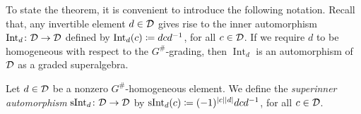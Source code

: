 
To state the theorem, it is convenient to introduce the following notation. 
Recall that, any invertible element $d\in \mathcal{D}$ gives rise to the inner automorphism $\operatorname{Int}_d\colon \mathcal{D} \to \mathcal{D}$ defined by $\operatorname{Int}_d (c) \coloneqq dcd^{-1}$, for all $c\in \mathcal{D}$. 
If we require $d$ to be homogeneous with respect to the $G^\#$-grading, then $\operatorname{Int}_d$ is an automorphism of $\mathcal{D}$ as a graded superalgebra.

\begin{defi}
    Let $d\in \mathcal{D}$ be a nonzero $G^\#$-homogeneous element. 
    We define the \emph{superinner automorphism} $\operatorname{sInt}_d\colon \mathcal{D} \to \mathcal{D}$ by $\operatorname{sInt}_d (c) \coloneqq (-1)^{|c||d|} dcd^{-1}$, for all $c\in \mathcal{D}$.
\end{defi}





